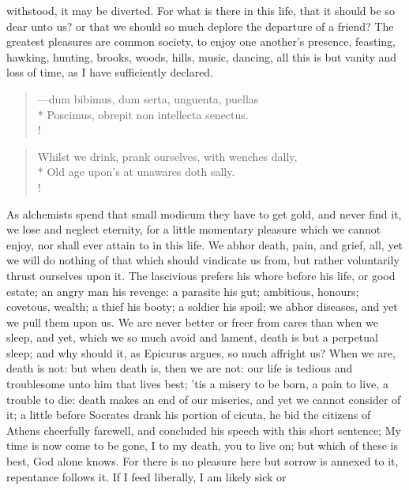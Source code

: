 {withstood, it may be diverted. For what is there in this life, that it
should be so dear unto us? or that we should so much deplore the
departure of a friend? The greatest pleasures are common society, to
enjoy one another's presence, feasting, hawking, hunting, brooks,
woods, hills, music, dancing, \etc{} all this is but vanity and loss of
time, as I have sufficiently declared.
%
%
\begin{latin}%
\begin{verse}%
---dum bibimus, dum serta, unguenta, puellas\\*
Poscimus, obrepit non intellecta senectus.\\!
\end{verse}%
\translationrule%
\end{latin}%
\begin{verse}%
Whilst we drink, prank ourselves, with wenches dally,\\*
Old age upon's at unawares doth sally.\\!
\end{verse}%
%
As alchemists spend that small modicum they have to get gold, and never
find it, we lose and neglect eternity, for a little momentary pleasure
which we cannot enjoy, nor shall ever attain to in this life. We abhor
death, pain, and grief, all, yet we will do nothing of that which
should vindicate us from, but rather voluntarily thrust ourselves upon
it.  The lascivious prefers his whore before his life, or good
estate; an angry man his revenge: a parasite his gut; ambitious,
honours; covetous, wealth; a thief his booty; a soldier his spoil; we
abhor diseases, and yet we pull them upon us. We are never better or
freer from cares than when we sleep, and yet, which we so much avoid
and lament, death is but a perpetual sleep; and why should it, as
Epicurus argues, so much affright us? When we are, death is not:
but when death is, then we are not: our life is tedious and troublesome
unto him that lives best; 'tis a misery to be born, a pain to
live, a trouble to die: death makes an end of our miseries, and yet we
cannot consider of it; a little before Socrates drank his portion
of cicuta, he bid the citizens of Athens cheerfully farewell, and
concluded his speech with this short sentence; My time is now come to
be gone, I to my death, you to live on; but which of these is best, God
alone knows. For there is no pleasure here but sorrow is annexed to it,
repentance follows it. If I feed liberally, I am likely sick or
}
